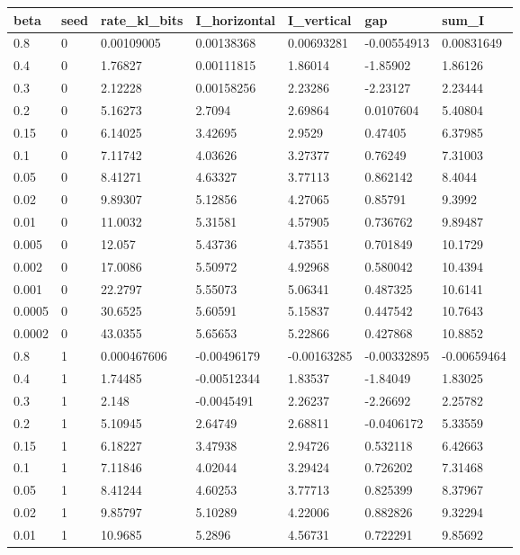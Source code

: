 \begin{tabular}{lllllll}
\toprule
beta & seed & rate\_kl\_bits & I\_horizontal & I\_vertical & gap & sum\_I \\
\midrule
0.8 & 0 & 0.00109005 & 0.00138368 & 0.00693281 & -0.00554913 & 0.00831649 \\
0.4 & 0 & 1.76827 & 0.00111815 & 1.86014 & -1.85902 & 1.86126 \\
0.3 & 0 & 2.12228 & 0.00158256 & 2.23286 & -2.23127 & 2.23444 \\
0.2 & 0 & 5.16273 & 2.7094 & 2.69864 & 0.0107604 & 5.40804 \\
0.15 & 0 & 6.14025 & 3.42695 & 2.9529 & 0.47405 & 6.37985 \\
0.1 & 0 & 7.11742 & 4.03626 & 3.27377 & 0.76249 & 7.31003 \\
0.05 & 0 & 8.41271 & 4.63327 & 3.77113 & 0.862142 & 8.4044 \\
0.02 & 0 & 9.89307 & 5.12856 & 4.27065 & 0.85791 & 9.3992 \\
0.01 & 0 & 11.0032 & 5.31581 & 4.57905 & 0.736762 & 9.89487 \\
0.005 & 0 & 12.057 & 5.43736 & 4.73551 & 0.701849 & 10.1729 \\
0.002 & 0 & 17.0086 & 5.50972 & 4.92968 & 0.580042 & 10.4394 \\
0.001 & 0 & 22.2797 & 5.55073 & 5.06341 & 0.487325 & 10.6141 \\
0.0005 & 0 & 30.6525 & 5.60591 & 5.15837 & 0.447542 & 10.7643 \\
0.0002 & 0 & 43.0355 & 5.65653 & 5.22866 & 0.427868 & 10.8852 \\
0.8 & 1 & 0.000467606 & -0.00496179 & -0.00163285 & -0.00332895 & -0.00659464 \\
0.4 & 1 & 1.74485 & -0.00512344 & 1.83537 & -1.84049 & 1.83025 \\
0.3 & 1 & 2.148 & -0.0045491 & 2.26237 & -2.26692 & 2.25782 \\
0.2 & 1 & 5.10945 & 2.64749 & 2.68811 & -0.0406172 & 5.33559 \\
0.15 & 1 & 6.18227 & 3.47938 & 2.94726 & 0.532118 & 6.42663 \\
0.1 & 1 & 7.11846 & 4.02044 & 3.29424 & 0.726202 & 7.31468 \\
0.05 & 1 & 8.41244 & 4.60253 & 3.77713 & 0.825399 & 8.37967 \\
0.02 & 1 & 9.85797 & 5.10289 & 4.22006 & 0.882826 & 9.32294 \\
0.01 & 1 & 10.9685 & 5.2896 & 4.56731 & 0.722291 & 9.85692 \\

\end{tabular}
